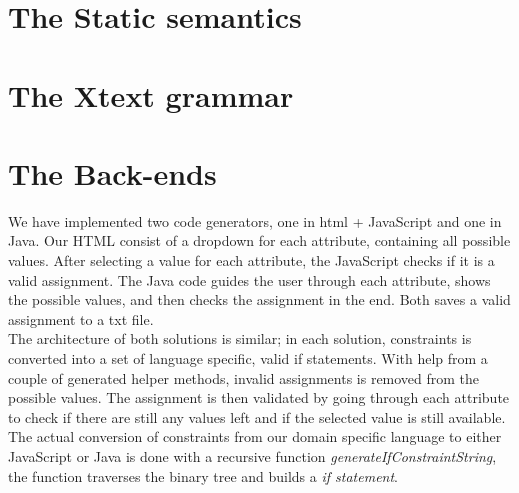 \documentclass[paper=a4, fontsize=11pt]{scrartcl} %
\numberwithin{equation}{section} %
\numberwithin{figure}{section} %
\numberwithin{table}{section} %
\begin{document}
\section{The Static semantics}



\section{The Xtext grammar}


\section{The Back-ends}
We have implemented two code generators, one in html + JavaScript and one in Java. Our HTML consist of a dropdown for each attribute, containing all possible values. After selecting a value for each attribute, the JavaScript checks if it is a valid assignment. The Java code guides the user through each attribute, shows the possible values, and then checks the assignment in the end. Both saves a valid assignment to a txt file.\\

The architecture of both solutions is similar; in each solution, constraints is converted into a set of language specific, valid if statements. With help from a couple of generated helper methods, invalid assignments is removed from the possible values. The assignment is then validated by going through each attribute to check if there are still any values left and if the selected value is still available.\\
The actual conversion of constraints from our domain specific language to either JavaScript or Java is done with a recursive function \textit{generateIfConstraintString}, the function traverses the binary tree and builds a \textit{if statement}. 
\end{document}

